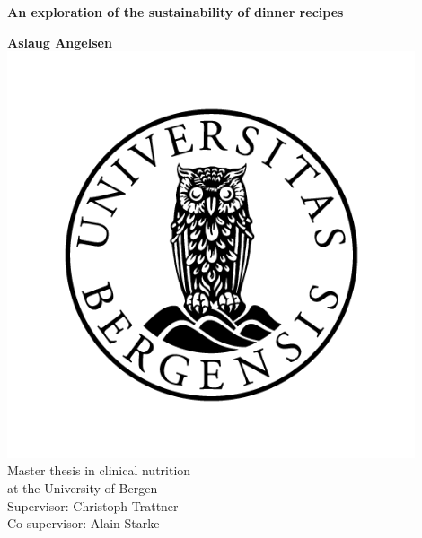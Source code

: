\thispagestyle{empty}

\begin{titlepage}

\begin{center}

\vspace*{2em}
        \fontsize{25}{24}
        \textbf{An exploration of the sustainability of dinner recipes}
        
        \vspace{0.5cm}
        \large\textbf{Aslaug Angelsen}
        \vspace{0.5cm}\\
		    \includegraphics[width=120mm]{images/emblem}
		    \vspace{0.5cm}\\
		    Master thesis in clinical nutrition\\
		    at the University of Bergen\\
		    \vspace{1.5cm}
		    Supervisor: Christoph Trattner\\
		    Co-supervisor: Alain Starke\\
		    \vspace{0.5cm}
      	\huge\date{2022}
      	
\end{center}
\end{titlepage}
\afterpage{\blankpage}


